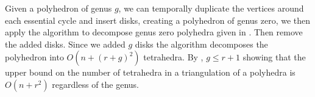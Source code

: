Given a polyhedron of genus $g$, we can temporally 
duplicate the vertices around each essential cycle and insert disks,
 creating a polyhedron of genus zero, we then apply the algorithm to
decompose genus zero polyhedra given in \cite{triangulating-polytope-1990}.
Then remove the added disks.
Since we added $g$ disks the algorithm decomposes
the polyhedron into $O(n+ (r+g)^2)$ tetrahedra.
By , $g\leq r+1$ showing that the upper bound
on the number of tetrahedra in a triangulation
of a polyhedra is $O(n+r^2)$ regardless of the genus.

